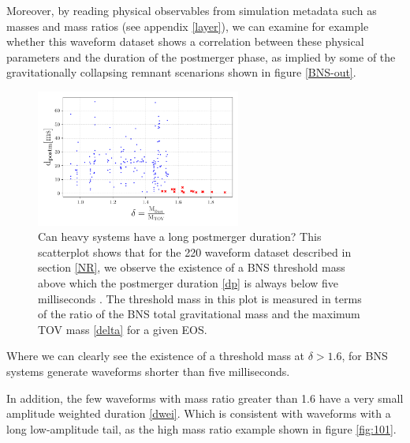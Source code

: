 \FloatBarrier 


Moreover, by reading physical observables from simulation metadata such as masses and mass ratios (see appendix \ref{layer}), we can examine for example whether this waveform dataset shows a correlation between these physical parameters and the duration of the postmerger phase, as implied by some of the gravitationally collapsing remnant scenarions shown in figure \ref{BNS-out}. 

\begin{figure}[hbt!]
\begin{center}
\includegraphics[width=0.6\textwidth, angle=0]{images/Data_analysis/results/res0.pdf}
\captionsetup{width=0.8\textwidth}
\caption[Can heavy systems have a long postmerger duration?]{Can heavy systems have a long postmerger duration? This scatterplot shows that for the 220 waveform dataset described in section \ref{NR}, we observe the existence of a BNS threshold mass above which the postmerger duration \ref{dp} is always below five milliseconds \cite{Kashyap_2022}. The threshold mass in this plot is measured in terms of the ratio of the BNS total gravitational mass and the maximum TOV mass \ref{delta} for a given EOS.}
\label{heavy systems}
\end{center}
\end{figure}
\FloatBarrier

Where we can clearly see the existence of a threshold mass at $\delta> 1.6$, for BNS systems generate waveforms shorter than five milliseconds.

In addition, the few waveforms with mass ratio greater than 1.6 have a very small amplitude weighted duration \ref{dwei}. Which is consistent with waveforms with a long low-amplitude tail, as the high mass ratio example shown in figure \ref{fig:101}.


